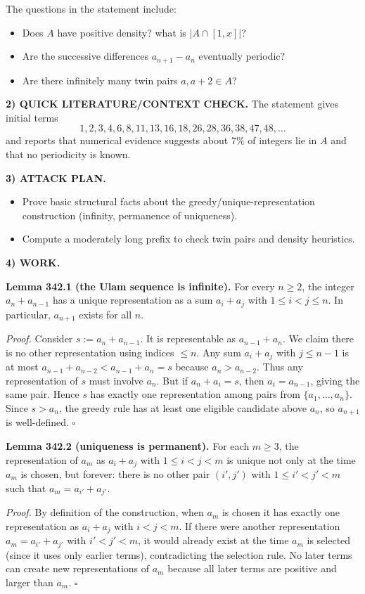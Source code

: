 The questions in the statement include:
\begin{itemize}
\item Does $A$ have positive density? what is $|A\cap[1,x]|$?
\item Are the successive differences $a_{n+1}-a_n$ eventually periodic?
\item Are there infinitely many twin pairs $a, a+2\in A$?
\end{itemize}

\medskip
\noindent\textbf{2) QUICK LITERATURE/CONTEXT CHECK.}
The statement gives initial terms
\[
1,2,3,4,6,8,11,13,16,18,26,28,36,38,47,48,\dots
\]
and reports that numerical evidence suggests about $7\%$ of integers lie in $A$ and that no periodicity is known.

\medskip
\noindent\textbf{3) ATTACK PLAN.}
\begin{itemize}
\item Prove basic structural facts about the greedy/unique-representation construction (infinity, permanence of uniqueness).
\item Compute a moderately long prefix to check twin pairs and density heuristics.
\end{itemize}

\medskip
\noindent\textbf{4) WORK.}

\medskip
\noindent\textbf{Lemma 342.1 (the Ulam sequence is infinite).}
For every $n\ge 2$, the integer $a_n+a_{n-1}$ has a unique representation as a sum $a_i+a_j$ with $1\le i<j\le n$. In particular, $a_{n+1}$ exists for all $n$.

\noindent\emph{Proof.}
Consider $s:=a_n+a_{n-1}$. It is representable as $a_{n-1}+a_n$.
We claim there is no other representation using indices $\le n$.
Any sum $a_i+a_j$ with $j\le n-1$ is at most $a_{n-1}+a_{n-2}<a_{n-1}+a_n=s$ because $a_n>a_{n-2}$.
Thus any representation of $s$ must involve $a_n$.
But if $a_n+a_i=s$, then $a_i=a_{n-1}$, giving the same pair.
Hence $s$ has exactly one representation among pairs from $\{a_1,\dots,a_n\}$.
Since $s>a_n$, the greedy rule has at least one eligible candidate above $a_n$, so $a_{n+1}$ is well-defined.
\hfill$\square$

\medskip
\noindent\textbf{Lemma 342.2 (uniqueness is permanent).}
For each $m\ge 3$, the representation of $a_m$ as $a_i+a_j$ with $1\le i<j<m$ is unique not only at the time $a_m$ is chosen, but forever: there is no other pair $(i',j')$ with $1\le i'<j'<m$ such that $a_m=a_{i'}+a_{j'}$.

\noindent\emph{Proof.}
By definition of the construction, when $a_m$ is chosen it has exactly one representation as $a_i+a_j$ with $i<j<m$.
If there were another representation $a_m=a_{i'}+a_{j'}$ with $i'<j'<m$, it would already exist at the time $a_m$ is selected (since it uses only earlier terms), contradicting the selection rule.
No later terms can create new representations of $a_m$ because all later terms are positive and larger than $a_m$.
\hfill$\square$

